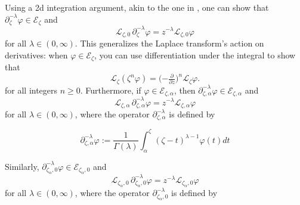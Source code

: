 \documentclass{article}
\theoremstyle{definition}
\newcommand{\fracderiv}[3]{\partial^{#1}_{#2, #3}}
\newcommand{\laplace}{\mathcal{L}}
\begin{document}


Using a 2d integration argument, akin to the one in \cite[Theorem~2.39]{laplace-tfm}, one can show that $\partial^{-\lambda}_{\zeta} \varphi \in \mathcal{E}_\zeta$ and
\[ \laplace_{\zeta,0}\,\partial^{-\lambda}_{\zeta} \varphi = z^{-\lambda} \laplace_{\zeta, 0} \varphi \]
for all $\lambda \in (0, \infty)$. This generalizes the Laplace transform's action on derivatives: when $\varphi \in \mathcal{E}_\zeta$, you can use differentiation under the integral to show that~\cite[Theorem~1.34]{laplace-tfm}
\begin{equation}%
\laplace_\zeta (\zeta^n \varphi) = \big({-\tfrac{\partial}{\partial z}}\big)^n \laplace_\zeta \varphi.
\end{equation}
for all integers $n \ge 0$.
Furthermore, if $\varphi\in\mathcal{E}_{\zeta,\alpha}$, then $\partial_{\zeta,\alpha}^{-\lambda}\varphi\in\mathcal{E}_{\zeta,\alpha}$ and 
\[ \laplace_{\zeta, \alpha}\,\fracderiv{-\lambda}{\zeta}{\alpha} \varphi = z^{-\lambda} \laplace_{\zeta, \alpha} \varphi \]
for all $\lambda \in (0, \infty)$, where the operator $\partial_{\zeta,\alpha}^{-\lambda}$ is defined by 

\begin{equation}
    \partial_{\zeta,\alpha}^{-\lambda}\varphi:=\frac{1}{\Gamma(\lambda)}\int_{\alpha}^{\zeta}(\zeta-t)^{\lambda-1} \varphi(t) dt
\end{equation}

Similarly, $\partial_{\zeta_\alpha,0}^{-\lambda}\varphi\in\mathcal{E}_{\zeta_\alpha,0}$ and 
\[ \laplace_{\zeta_\alpha,0}\,\fracderiv{-\lambda}{\zeta_\alpha}{0} \varphi = z^{-\lambda} \laplace_{\zeta_\alpha,0} \varphi \]
for all $\lambda \in (0, \infty)$, where the operator $\partial_{\zeta_\alpha,0}^{-\lambda}$ is defined by 
\end{document}
